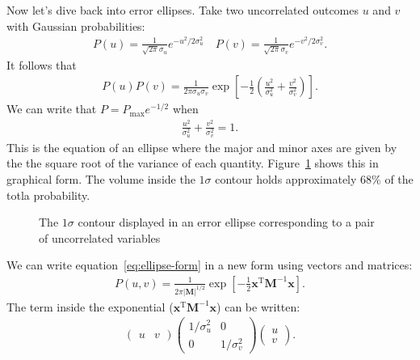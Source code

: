 \documentclass{article}
\newcommand{\vecb}[1]{\boldsymbol{\mathbf{#1}}}
\begin{document}
Now let's dive back into error ellipses. Take two uncorrelated outcomes $u$ and $v$ with Gaussian probabilities:
\begin{align}
  P(u) = \frac{1}{\sqrt{2\pi}\sigma_u}e^{-u^2/2\sigma_u^2} \quad P(v) = \frac{1}{\sqrt{2\pi}\sigma_v}e^{-v^2/2\sigma_v^2}.
\end{align}
It follows that
\begin{align}
  P(u)P(v) = \frac{1}{2\pi\sigma_u\sigma_v}\exp\left[-\frac{1}{2}\left(\frac{u^2}{\sigma_u^2}+\frac{v^2}{\sigma_v^2}\right)\right].
  \label{eq:ellipse-form}
\end{align}
We can write that $P=P_{\text{max}}e^{-1/2}$ when
\begin{align*}
  \frac{u^2}{\sigma_u^2}+\frac{v^2}{\sigma_v^2} = 1.
\end{align*}
This is the equation of an ellipse where the major and minor axes are given by the the square root of the variance of each quantity. Figure~\ref{fig:ellipse1} shows this in graphical form. The volume inside the  $1\sigma$ contour holds approximately 68\% of the totla probability.
\begin{figure} 
  \centering
  \caption{The $1\sigma$ contour displayed in an error ellipse corresponding to a pair of uncorrelated variables}
  \label{fig:ellipse1}
\end{figure}
We can write equation~\ref{eq:ellipse-form} in a new form using vectors and matrices:
\begin{align}
  P(u,v) = \frac{1}{2\pi\left|\vecb{M}\right|^{1/2}}\exp\left[-\frac{1}{2}\vecb{x}^{\mathrm{T}}\vecb{M}^{-1}\vecb{x}\right].
\end{align}
The term inside the exponential ($\vecb{x}^{\mathrm{T}}\vecb{M}^{-1}\vecb{x}$) can be written:
\begin{align*}
  \begin{pmatrix}
    u            & v
  \end{pmatrix}
  \begin{pmatrix}
    1/\sigma_u^2 & 0                                \\
    0            & 1/\sigma_v^2
  \end{pmatrix}
  \begin{pmatrix}
    u                                               \\
    v
  \end{pmatrix}.
\end{align*}
\end{document}
